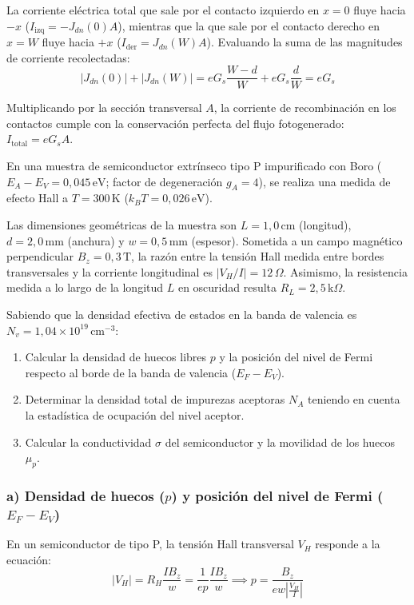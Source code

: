 \begin{problema}
La corriente eléctrica total que sale por el contacto izquierdo en $x = 0$ fluye hacia $-x$ ($I_{\text{izq}} = -J_{dn}(0) A$), mientras que la que sale por el contacto derecho en $x = W$ fluye hacia $+x$ ($I_{\text{der}} = J_{dn}(W) A$). Evaluando la suma de las magnitudes de corriente recolectadas:
\[
|J_{dn}(0)| + |J_{dn}(W)| = e G_s \frac{W - d}{W} + e G_s \frac{d}{W} = e G_s
\]

Multiplicando por la sección transversal $A$, la corriente de recombinación en los contactos cumple con la conservación perfecta del flujo fotogenerado: $I_{\text{total}} = e G_s A$.
\end{problema}

\newpage
\begin{problema}
En una muestra de semiconductor extrínseco tipo P impurificado con Boro ($E_A - E_V = 0,045\,\text{eV}$; factor de degeneración $g_A = 4$), se realiza una medida de efecto Hall a $T = 300\,\text{K}$ ($k_B T = 0,026\,\text{eV}$).

Las dimensiones geométricas de la muestra son $L = 1,0\,\text{cm}$ (longitud), $d = 2,0\,\text{mm}$ (anchura) y $w = 0,5\,\text{mm}$ (espesor). Sometida a un campo magnético perpendicular $B_z = 0,3\,\text{T}$, la razón entre la tensión Hall medida entre bordes transversales y la corriente longitudinal es $|V_H / I| = 12\,\Omega$. Asimismo, la resistencia medida a lo largo de la longitud $L$ en oscuridad resulta $R_L = 2,5\,\text{k}\Omega$.

Sabiendo que la densidad efectiva de estados en la banda de valencia es $N_v = 1,04 \times 10^{19}\,\text{cm}^{-3}$:

\begin{enumerate}[label=\alph*)]
    \item Calcular la densidad de huecos libres $p$ y la posición del nivel de Fermi respecto al borde de la banda de valencia ($E_F - E_V$).
    \item Determinar la densidad total de impurezas aceptoras $N_A$ teniendo en cuenta la estadística de ocupación del nivel aceptor.
    \item Calcular la conductividad $\sigma$ del semiconductor y la movilidad de los huecos $\mu_p$.
\end{enumerate}

\tcblower
\subsubsection*{a) Densidad de huecos ($p$) y posición del nivel de Fermi ($E_F - E_V$)}
En un semiconductor de tipo P, la tensión Hall transversal $V_H$ responde a la ecuación:
\[
|V_H| = R_H \frac{I B_z}{w} = \frac{1}{e p} \frac{I B_z}{w} \implies p = \frac{B_z}{e w \left| \frac{V_H}{I} \right|}
\]


\end{problema}
